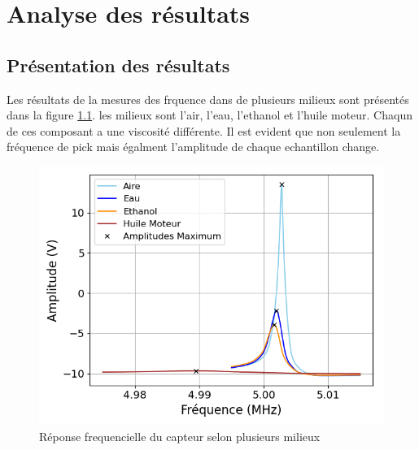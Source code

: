\chapter{Analyse des résultats}

\section{Présentation des résultats}
Les résultats de la mesures des frquence dans de plusieurs milieux sont présentés dans la figure \ref{fig:Réponse frequencielle amplitude}.
les milieux sont l'air, l'eau, l'ethanol et l'huile moteur. Chaqun de ces composant a une viscosité différente. 
Il est evident que non seulement la fréquence de pick mais égalment l'amplitude de chaque echantillon change. 
\begin{figure}[H]
    \centering
    \includegraphics[width=\textwidth]{assets/figures/reponseFrequence.png}
    \caption{Réponse frequencielle du capteur selon plusieurs milieux}
    \label{fig:Réponse frequencielle amplitude}
\end{figure}

